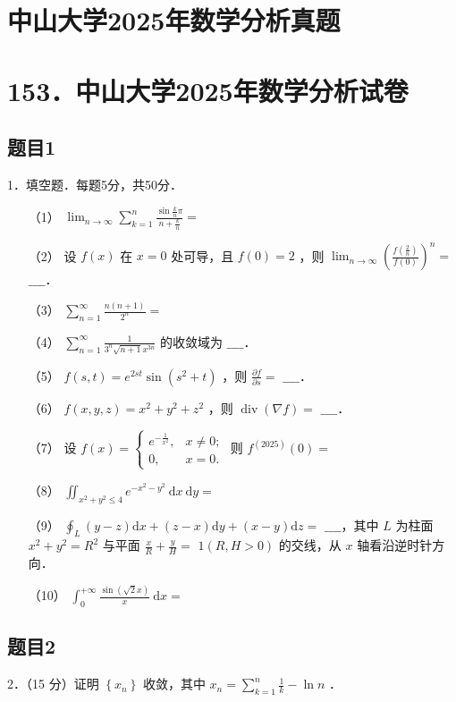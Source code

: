 \documentclass{article}
\begin{document}
\section*{中山大学2025年数学分析真题}
\section*{153．中山大学2025年数学分析试卷}

\subsection{题目1}
1．填空题．每题5分，共50分．

\begin{itemize}
  \item[（1）] \(\lim _{n \rightarrow \infty} \sum_{k=1}^{n} \frac{\sin \frac{k}{n} \pi}{n+\frac{k}{n}}=\)
  \item[（2）] 设 \(f(x)\) 在 \(x=0\) 处可导，且 \(f(0)=2\) ，则 \(\lim _{n \rightarrow \infty}\left(\frac{f\left(\frac{2}{n}\right)}{f(0)}\right)^{n}=\) \(\_\_\_\_\)．
  \item[（3）] \(\sum_{n=1}^{\infty} \frac{n(n+1)}{2^{n}}=\)
  \item[（4）] \(\sum_{n=1}^{\infty} \frac{1}{3^{n} \sqrt{n+1} x^{3 n}}\) 的收敛域为 \(\_\_\_\_\)．
  \item[（5）] \(f(s, t)=e^{2 s t} \sin \left(s^{2}+t\right)\) ，则 \(\frac{\partial f}{\partial s}=\) \(\_\_\_\_\)．
  \item[（6）] \(f(x, y, z)=x^{2}+y^{2}+z^{2}\) ，则 \(\operatorname{div}(\nabla f)=\) \(\_\_\_\_\)．
  \item[（7）] 设 \(f(x)=\left\{\begin{array}{ll}e^{-\frac{1}{x^{2}}}, & x \neq 0 ; \\ 0, & x=0 .\end{array}\right.\) 则 \(f^{(2025)}(0)=\)
  \item[（8）] \(\iint_{x^{2}+y^{2} \leq 4} e^{-x^{2}-y^{2}} \mathrm{~d} x \mathrm{~d} y=\)
  \item[（9）] \(\oint_{L}(y-z) \mathrm{d} x+(z-x) \mathrm{d} y+(x-y) \mathrm{d} z=\) \(\_\_\_\_\)，其中 \(L\) 为柱面 \(x^{2}+y^{2}=R^{2}\) 与平面 \(\frac{x}{R}+\frac{y}{H}=\) \(1(R, H>0)\) 的交线，从 \(x\) 轴看沿逆时针方向．
  \item[（10）] \(\int_{0}^{+\infty} \frac{\sin (\sqrt{2} x)}{x} \mathrm{~d} x=\)
\end{itemize}

\subsection{题目2}
2．（15 分）证明 \(\left\{x_{n}\right\}\) 收敛，其中 \(x_{n}=\sum_{k=1}^{n} \frac{1}{k}-\ln n\) ．
\end{document}
